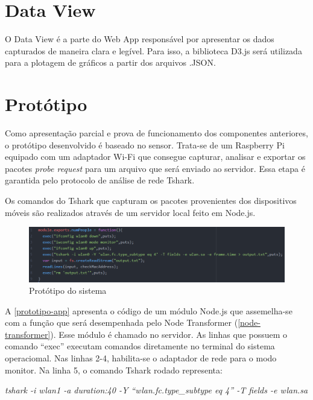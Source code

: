 \section{Data View}
O Data View é a parte do Web App responsável por apresentar os dados capturados
de maneira clara e legível. Para isso, a biblioteca D3.js \cite{D32017} será
utilizada para a plotagem de gráficos a partir dos arquivos .JSON.

\section{Protótipo}
Como apresentação parcial e prova de funcionamento dos componentes anteriores, o protótipo desenvolvido é baseado no sensor.
Trata-se de um Raspberry Pi equipado com um adaptador Wi-Fi que consegue capturar, analisar e exportar os pacotes
\emph{probe request} para um arquivo que será enviado ao servidor. Essa etapa é garantida pelo protocolo de análise de rede
Tshark.

Os comandos do Tshark que capturam os pacotes provenientes dos dispositivos móveis são realizados através de um servidor local
feito em Node.js.

\begin{figure}[!h]
  \caption{\label{prototipo-app}Protótipo do sistema}
  \begin{center}
    \includegraphics[width=1.0\textwidth]{img/prototipo-app.png}
  \end{center}
\end{figure}

A \autoref{prototipo-app} apresenta o código de um módulo Node.js que
assemelha-se com a função que será desempenhada pelo Node Transformer
(\autoref{node-transformer}). Esse módulo é chamado no servidor. As linhas que
possuem o comando ``exec'' executam comandos diretamente no terminal do sistema
operaciomal. Nas linhas 2-4, habilita-se o adaptador de rede para o modo
monitor. Na linha 5, o comando Tshark rodado representa:
\begin{center}
\emph{tshark -i wlan1 -a duration:40 -Y ``wlan.fc.type\_subtype eq 4'' -T fields -e wlan.sa}
\end{center}


